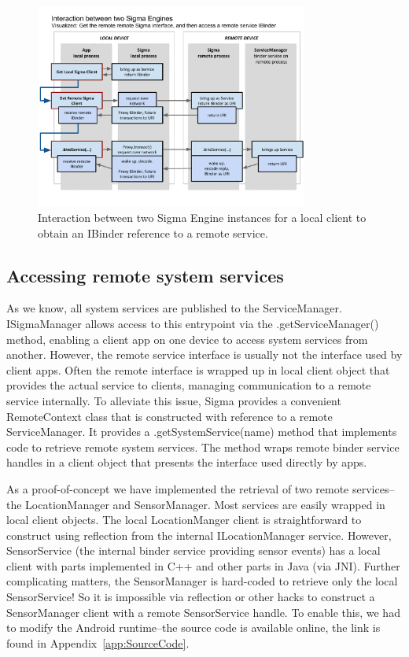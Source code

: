 \documentclass[prodmode]{acmlarge}
\begin{document}
\begin{figure}[h]
\centering
\includegraphics[width=0.8\textwidth]{drawings/SigmaEngineInteraction.pdf}
\caption{Interaction between two Sigma Engine instances for a local client to obtain an IBinder reference to a remote service.}
\label{fig:SigmaInteraction}
\end{figure}

\subsection{Accessing remote system services}
As we know, all system services are published to the ServiceManager. ISigmaManager allows access to this entrypoint via the .getServiceManager() method, enabling a client app on one device to access system services from another. However, the remote service interface is usually not the interface used by client apps. Often the remote interface is wrapped up in local client object that provides the actual service to clients, managing communication to a remote service internally. To alleviate this issue, Sigma provides a convenient RemoteContext class that is constructed with reference to a remote ServiceManager. It provides a .getSystemService(name) method that implements code to retrieve remote system services. The method wraps remote binder service handles in a client object that presents the interface used directly by apps.

As a proof-of-concept we have implemented the retrieval of two remote services--the LocationManager and SensorManager. Most services are easily wrapped in local client objects. The local LocationManger client is straightforward to construct using reflection from the internal ILocationManager service. However, SensorService (the internal binder service providing sensor events) has a local client with parts implemented in C++ and other parts in Java (via JNI). Further complicating matters, the SensorManager is hard-coded to retrieve only the local SensorService! So it is impossible via reflection or other hacks to construct a SensorManager client with a remote SensorService handle. To enable this, we had to modify the Android runtime--the source code is available online, the link is found in Appendix~\ref{app:SourceCode}.
\end{document}

